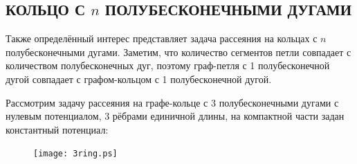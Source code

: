 \documentclass[a4 paper, 12 pt]{extarticle}
\begin{document}
   \subsection{КОЛЬЦО С $n$ ПОЛУБЕСКОНЕЧНЫМИ ДУГАМИ}
   Также определённый интерес представляет задача рассеяния на кольцах с $n$ полубесконечными дугами. Заметим, что количество сегментов петли совпадает с количеством полубесконечных дуг, поэтому граф-петля с 1 полубесконечной дугой совпадает с графом-кольцом с 1 полубесконечной дугой.
   
   Рассмотрим задачу рассеяния на графе-кольце с 3 полубесконечными дугами с нулевым потенциалом, 3 рёбрами единичной длины, на компактной части задан константный потенциал:
   \begin{figure}[h]
   	\centering
      	\texttt{[image: 3ring.ps]}
   \end{figure}
   
\end{document}
